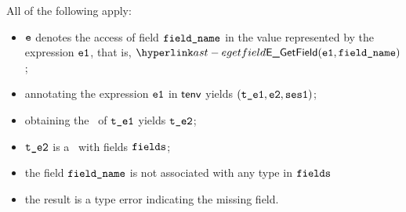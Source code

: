 \ProseParagraph
All of the following apply:
\begin{itemize}
  \item $\ve$ denotes the access of field $\fieldname$ in the value represented by the expression $\veone$, that is, $\EGetField(\veone, \fieldname)$;
  \item annotating the expression $\veone$ in $\tenv$ yields $(\vteone, \vetwo, \vsesone)$\ProseOrTypeError;
  \item obtaining the \underlyingtype\ of $\vteone$ yields $\vtetwo$\ProseOrTypeError;
  \item $\vtetwo$ is a \structuredtype\ with fields $\fields$;
  \item the field $\fieldname$ is not associated with any type in $\fields$
  \item the result is a type error indicating the missing field.
\end{itemize}
\FormallyParagraph
\begin{mathpar}
\end{mathpar}

